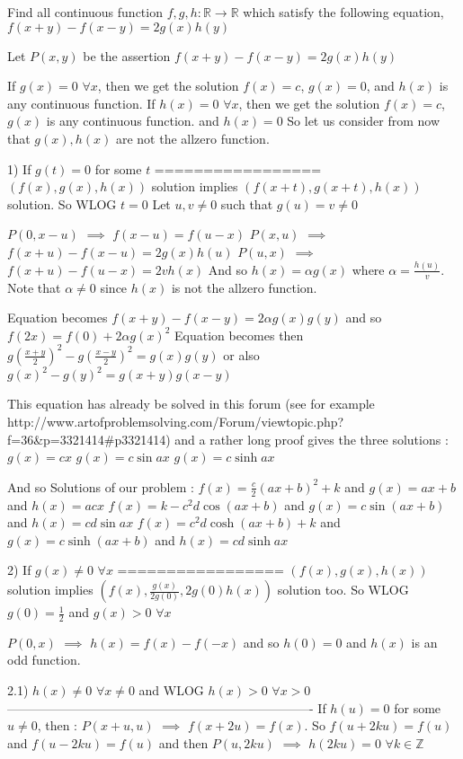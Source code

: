 \begin{solution}
	\begin{tcolorbox}Find all continuous function $f,g,h:\mathbb{R} \to \mathbb{R}$ which satisfy the following equation,
           $f(x+y)-f(x-y)=2 g(x)h(y)$\end{tcolorbox}
Let $P(x,y)$ be the assertion $f(x+y)-f(x-y)=2g(x)h(y)$

If $g(x)=0$ $\forall x$, then we get the solution $f(x)=c$, $g(x)=0$, and $h(x)$ is any continuous function.
If $h(x)=0$ $\forall x$, then we get the solution $f(x)=c$, $g(x)$ is any continuous function. and $h(x)=0$ 
So let us consider from now that $g(x),h(x)$ are not the allzero function.

1) If $g(t)=0$ for some $t$ 
=================
$(f(x),g(x),h(x))$ solution implies $(f(x+t),g(x+t),h(x))$ solution. So WLOG $t=0$
Let $u,v\ne 0$ such that $g(u)=v\ne 0$

$P(0,x-u)$ $\implies$ $f(x-u)=f(u-x)$
$P(x,u)$ $\implies$ $f(x+u)-f(x-u)=2g(x)h(u)$
$P(u,x)$ $\implies$ $f(x+u)-f(u-x)=2vh(x)$
And so $h(x)=\alpha g(x)$ where $\alpha=\frac{h(u)}v$. Note that $\alpha\ne 0$ since $h(x)$ is not the allzero function.

Equation becomes $f(x+y)-f(x-y)=2\alpha g(x)g(y)$ and so  $f(2x)=f(0)+2\alpha g(x)^2$
Equation becomes then $g(\frac{x+y}2)^2-g(\frac{x-y}2)^2=g(x)g(y)$ or also $g(x)^2-g(y)^2=g(x+y)g(x-y)$

This equation has already be solved in this forum (see for example http://www.artofproblemsolving.com/Forum/viewtopic.php?f=36&p=3321414#p3321414) and a rather long proof gives the three solutions :
$g(x)=cx$
$g(x)=c\sin ax$
$g(x)=c\sinh ax$

And so Solutions of our problem :
$f(x)=\frac{c}2(ax+b)^2+k$ and $g(x)=ax+b$ and $h(x)=acx$
$f(x)=k-c^2d\cos(ax+b)$ and $g(x)=c\sin(ax+b)$ and $h(x)=cd\sin ax$
$f(x)=c^2d\cosh(ax+b)+k$ and $g(x)=c\sinh(ax+b)$ and $h(x)=cd\sinh ax$


2) If $g(x)\ne 0$ $\forall x$
=================
$(f(x),g(x),h(x))$ solution implies $(f(x),\frac{g(x)}{2g(0)},2g(0)h(x))$ solution too. So WLOG $g(0)=\frac 12$ and $g(x)>0$ $\forall x$

$P(0,x)$ $\implies$ $h(x)=f(x)-f(-x)$ and so $h(0)=0$ and $h(x)$ is an odd function.

2.1) $h(x)\ne 0$ $\forall x\ne 0$ and WLOG $h(x)>0$ $\forall x>0$
-------------------------------------------------------------------------
If $h(u)=0$ for some $u\ne 0$, then :
$P(x+u,u)$ $\implies$ $f(x+2u)=f(x)$. So $f(u+2ku)=f(u)$ and $f(u-2ku)=f(u)$ and then 
$P(u,2ku)$ $\implies$ $h(2ku)=0$ $\forall k\in\mathbb Z$


\end{solution}
